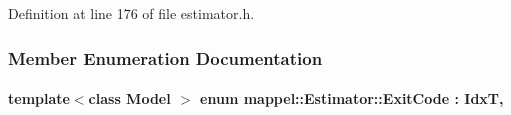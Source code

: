 Definition at line 176 of file estimator.\+h.



\subsubsection{Member Enumeration Documentation}
\paragraph[{\texorpdfstring{Exit\+Code}{ExitCode}}]{\setlength{\rightskip}{0pt plus 5cm}template$<$class Model $>$ enum {\bf mappel\+::\+Estimator\+::\+Exit\+Code} \+: {\bf IdxT}\hspace{0.3cm}{\ttfamily [strong]}, {\ttfamily [inherited]}}\hypertarget{classmappel_1_1Estimator_a6d599915907ba4d0607fcb958d231edc}{}\label{classmappel_1_1Estimator_a6d599915907ba4d0607fcb958d231edc}
